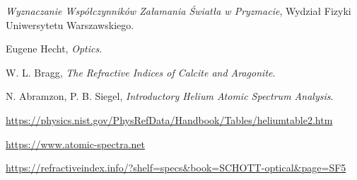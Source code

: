 \documentclass[12pt]{article}
\begin{document}
\newpage
\begin{thebibliography}{6}

\emph{Wyznaczanie Współczynników Załamania Światła w Pryzmacie}, Wydział Fizyki Uniwersytetu Warszawskiego.

Eugene Hecht, \emph{Optics}.

W. L. Bragg, \emph{The Refractive Indices of Calcite and Aragonite}.

N. Abramzon, P. B. Siegel, \emph{Introductory Helium Atomic Spectrum Analysis}.

\url{https://physics.nist.gov/PhysRefData/Handbook/Tables/heliumtable2.htm}

\url{https://www.atomic-spectra.net}

\url{https://refractiveindex.info/?shelf=specs&book=SCHOTT-optical&page=SF5}

\end{thebibliography}
\end{document}
